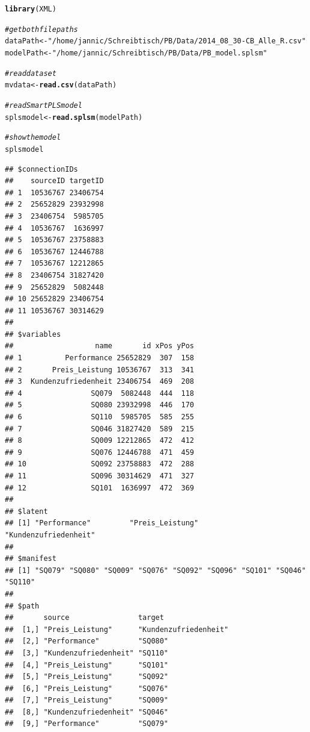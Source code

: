 \documentclass{article}\usepackage[]{graphicx}\usepackage[]{color}
\makeatletter
\newcommand{\hlstr}[1]{\textcolor[rgb]{0.192,0.494,0.8}{#1}}%
\newcommand{\hlcom}[1]{\textcolor[rgb]{0.678,0.584,0.686}{\textit{#1}}}%
\newcommand{\hlstd}[1]{\textcolor[rgb]{0.345,0.345,0.345}{#1}}%
\newcommand{\hlkwb}[1]{\textcolor[rgb]{0.69,0.353,0.396}{#1}}%
\newcommand{\hlkwd}[1]{\textcolor[rgb]{0.737,0.353,0.396}{\textbf{#1}}}%
\newenvironment{kframe}{%
 \def\at@end@of@kframe{}%
 \ifinner\ifhmode%
  \def\at@end@of@kframe{\end{minipage}}%
  \begin{minipage}{\columnwidth}%
 \fi\fi%
 \def\FrameCommand##1{\hskip\@totalleftmargin \hskip-\fboxsep
 \colorbox{shadecolor}{##1}\hskip-\fboxsep
     \hskip-\linewidth \hskip-\@totalleftmargin \hskip\columnwidth}%
 \MakeFramed {\advance\hsize-\width
   \@totalleftmargin\z@ \linewidth\hsize
   \@setminipage}}%
 {\par\unskip\endMakeFramed%
 \at@end@of@kframe}
\newenvironment{knitrout}{}{} %
\makeatother
\begin{document}
\begin{knitrout}
\color{fgcolor}\begin{kframe}
\begin{alltt}
\hlkwd{library}\hlstd{(XML)}

\hlcom{#get both filepaths}
\hlstd{dataPath} \hlkwb{<-} \hlstr{"/home/jannic/Schreibtisch/PB/Data/2014_08_30-CB_Alle_R.csv"}
\hlstd{modelPath} \hlkwb{<-} \hlstr{"/home/jannic/Schreibtisch/PB/Data/PB_model.splsm"}

\hlcom{#read dataset}
\hlstd{mvdata} \hlkwb{<-} \hlkwd{read.csv}\hlstd{(dataPath)}

\hlcom{#read SmartPLS model}
\hlstd{splsmodel} \hlkwb{<-} \hlkwd{read.splsm}\hlstd{(modelPath)}

\hlcom{#show the model}
\hlstd{splsmodel}
\end{alltt}
\begin{verbatim}
## $connectionIDs
##    sourceID targetID
## 1  10536767 23406754
## 2  25652829 23932998
## 3  23406754  5985705
## 4  10536767  1636997
## 5  10536767 23758883
## 6  10536767 12446788
## 7  10536767 12212865
## 8  23406754 31827420
## 9  25652829  5082448
## 10 25652829 23406754
## 11 10536767 30314629
## 
## $variables
##                   name       id xPos yPos
## 1          Performance 25652829  307  158
## 2       Preis_Leistung 10536767  313  341
## 3  Kundenzufriedenheit 23406754  469  208
## 4                SQ079  5082448  444  118
## 5                SQ080 23932998  446  170
## 6                SQ110  5985705  585  255
## 7                SQ046 31827420  589  215
## 8                SQ009 12212865  472  412
## 9                SQ076 12446788  471  459
## 10               SQ092 23758883  472  288
## 11               SQ096 30314629  471  327
## 12               SQ101  1636997  472  369
## 
## $latent
## [1] "Performance"         "Preis_Leistung"      "Kundenzufriedenheit"
## 
## $manifest
## [1] "SQ079" "SQ080" "SQ009" "SQ076" "SQ092" "SQ096" "SQ101" "SQ046" "SQ110"
## 
## $path
##       source                target               
##  [1,] "Preis_Leistung"      "Kundenzufriedenheit"
##  [2,] "Performance"         "SQ080"              
##  [3,] "Kundenzufriedenheit" "SQ110"              
##  [4,] "Preis_Leistung"      "SQ101"              
##  [5,] "Preis_Leistung"      "SQ092"              
##  [6,] "Preis_Leistung"      "SQ076"              
##  [7,] "Preis_Leistung"      "SQ009"              
##  [8,] "Kundenzufriedenheit" "SQ046"              
##  [9,] "Performance"         "SQ079"              

\end{verbatim}
\end{kframe}
\end{knitrout}
\end{document}
